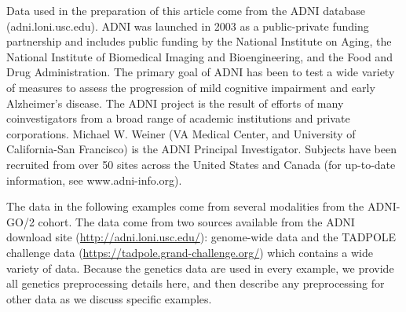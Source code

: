 \documentclass[12pt]{article}
\begin{document}
\label{section:data}

Data used in the preparation of this article come from the ADNI database
(adni.loni.usc.edu). ADNI was launched in 2003 as a public-private
funding partnership and includes public funding by the National
Institute on Aging, the National Institute of Biomedical Imaging and
Bioengineering, and the Food and Drug Administration. The primary goal
of ADNI has been to test a wide variety of measures to assess the
progression of mild cognitive impairment and early Alzheimer's disease.
The ADNI project is the result of efforts of many coinvestigators from a
broad range of academic institutions and private corporations. Michael
W. Weiner (VA Medical Center, and University of California-San
Francisco) is the ADNI Principal Investigator. Subjects have been
recruited from over 50 sites across the United States and Canada (for
up-to-date information, see www.adni-info.org).

The data in the following examples come from several modalities from the
ADNI-GO/2 cohort. The data come from two sources available from the ADNI
download site (\url{http://adni.loni.usc.edu/}): genome-wide data and
the TADPOLE challenge data (\url{https://tadpole.grand-challenge.org/})
which contains a wide variety of data. Because the genetics data are
used in every example, we provide all genetics preprocessing details
here, and then describe any preprocessing for other data as we discuss
specific examples.
\end{document}

